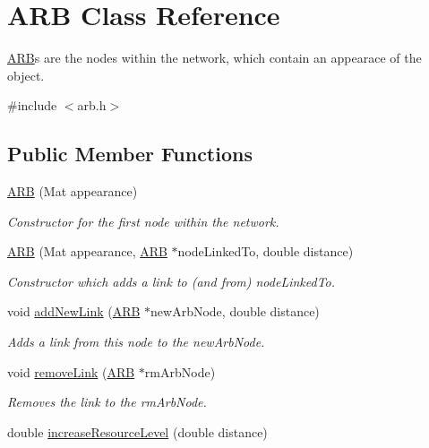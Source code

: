 \hypertarget{class_a_r_b}{}\section{A\+R\+B Class Reference}
\label{class_a_r_b}


\hyperlink{class_a_r_b}{A\+R\+B}\textquotesingle{}s are the nodes within the network, which contain an appearace of the object.  




{\ttfamily \#include $<$arb.\+h$>$}

\subsection*{Public Member Functions}
\begin{DoxyCompactItemize}
\item 
\hyperlink{class_a_r_b_a63baffccea281b3131c527c9c1f7f75d}{A\+R\+B} (Mat appearance)
\begin{DoxyCompactList}\small\item\em Constructor for the first node within the network. \end{DoxyCompactList}\item 
\hyperlink{class_a_r_b_ad3e230c460681d7a8d25f854d54a7068}{A\+R\+B} (Mat appearance, \hyperlink{class_a_r_b}{A\+R\+B} $\ast$node\+Linked\+To, double distance)
\begin{DoxyCompactList}\small\item\em Constructor which adds a link to (and from) node\+Linked\+To. \end{DoxyCompactList}\item 
void \hyperlink{class_a_r_b_aa3f04bd47ff47fb9c04ec5172bd299e9}{add\+New\+Link} (\hyperlink{class_a_r_b}{A\+R\+B} $\ast$new\+Arb\+Node, double distance)
\begin{DoxyCompactList}\small\item\em Adds a link from this node to the new\+Arb\+Node. \end{DoxyCompactList}\item 
void \hyperlink{class_a_r_b_ab8f2944c4604d2fff3771bf3306e2070}{remove\+Link} (\hyperlink{class_a_r_b}{A\+R\+B} $\ast$rm\+Arb\+Node)
\begin{DoxyCompactList}\small\item\em Removes the link to the rm\+Arb\+Node. \end{DoxyCompactList}\item 
double \hyperlink{class_a_r_b_a8df8e8956b9454bd7341cc6aeae2ae88}{increase\+Resource\+Level} (double distance)

\end{DoxyCompactItemize}
